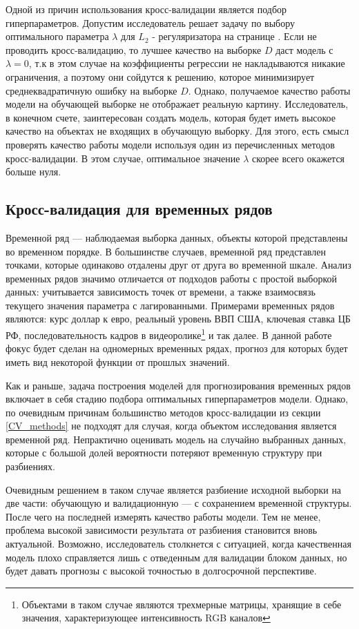 \documentclass[a4paper, 14pt]{article}
\begin{document}
Одной из причин использования кросс-валидации является подбор гиперпараметров. Допустим исследователь решает задачу по выбору оптимального параметра $\lambda$ для $L_2$ - регуляризатора на странице \pageref{ridge}. Если не проводить кросс-валидацию, то лучшее качество на выборке $D$ даст модель с $\lambda = 0$, т.к в этом случае на коэффициенты регрессии не накладываются никакие ограничения, а поэтому они сойдутся к решению, которое минимизирует среднеквадратичную ошибку на выборке $D$. Однако, получаемое качество работы модели на обучающей выборке не отображает реальную картину. Исследователь, в конечном счете, заинтересован создать модель, которая будет иметь высокое качество на объектах не входящих в обучающую выборку. Для этого, есть смысл проверять качество работы модели используя один из перечисленных методов кросс-валидации. В этом случае, оптимальное значение $\lambda$ скорее всего окажется больше нуля.

\subsection{Кросс-валидация для временных рядов}

Временной ряд --- наблюдаемая выборка данных, объекты которой представлены во временном порядке. В большинстве случаев, временной ряд представлен точками, которые одинаково отдалены друг от друга во временной шкале. Анализ временных рядов значимо отличается от подходов работы с простой выборкой данных:  учитывается зависимость точек от времени, а также взаимосвязь текущего значения параметра с лагированными. Примерами временных рядов являются: курс доллар к евро, реальный уровень ВВП США, ключевая ставка ЦБ РФ, последовательность кадров в видеоролике\footnote{Объектами в таком случае являются трехмерные матрицы, хранящие в себе значения, характеризующее интенсивность RGB каналов} и так далее. В данной работе фокус будет сделан на одномерных временных рядах, прогноз для которых будет иметь вид некоторой функции от прошлых значений. 

Как и раньше, задача построения моделей для прогнозирования временных рядов включает в себя стадию подбора оптимальных гиперпараметров модели. Однако, по очевидным причинам большинство методов кросс-валидации из секции \ref{CV_methods} не подходят для случая, когда объектом исследования является временной ряд. Непрактично оценивать модель на случайно выбранных данных, которые с большой долей вероятности потеряют временную структуру при разбиениях. 

Очевидным решением в таком случае является разбиение исходной выборки на две части: обучающую и валидационную --- с сохранением временной структуры. После чего на последней измерять качество работы модели. Тем не менее, проблема высокой зависимости результата от разбиения становится вновь актуальной. Возможно, исследователь столкнется с ситуацией, когда качественная модель плохо справляется лишь с отведенным для валидации блоком данных, но будет давать прогнозы с высокой точностью в долгосрочной перспективе. 
\end{document}
